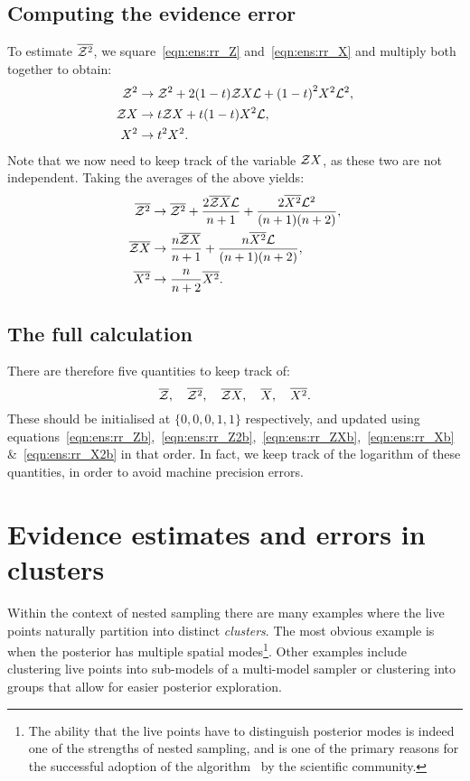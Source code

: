 \subsection{Computing the evidence error}
\label{sec:ens:basic_error}
To estimate \(\overline{\mathcal{Z}^2}\), we square~\eqref{eqn:ens:rr_Z} and~\eqref{eqn:ens:rr_X} and multiply both together to obtain:
%
\begin{align}
  \mathcal{Z}^2 &\to \mathcal{Z}^2 + 2(1-t)\mathcal{Z} X\mathcal{L} +  {(1-t)}^2X^2\mathcal{L} ^2,
  \label{eqn:ens:rr_Z2b}
  \\
  \mathcal{Z} X &\to t\mathcal{Z} X + t(1-t)X^2\mathcal{L},
  \label{eqn:ens:rr_ZXb}
  \\
  X^2 &\to t^2X^2.
  \label{eqn:ens:rr_X2b}
\end{align}
%
Note that we now need to keep track of the variable \(\mathcal{Z} X\), as these two are not independent.
Taking the averages of the above yields:
\begin{align}
  \overline{\mathcal{Z}^2} &\to \overline{\mathcal{Z}^2} + \frac{2\overline{\mathcal{Z} X}\mathcal{L}}{n+1} +  \frac{2\overline{X^2}\mathcal{L}^2}{(n+1)(n+2)},
  \\
  \overline{\mathcal{Z} X} &\to \frac{n\overline{\mathcal{Z} X}}{n+1} + \frac{n\overline{X^2}\mathcal{L}}{(n+1)(n+2)},
  \\
  \overline{X^2} &\to \frac{n}{n+2}\overline{X^2}.
\end{align}

\subsection{The full calculation}
\label{sec:ens:basic_full}

There are therefore five quantities to keep track of: 
\[ \overline{\mathcal{Z}},\quad\overline{\mathcal{Z}^2},\quad\overline{\mathcal{Z} X},\quad \overline{X},\quad\overline{X^2}.\]
These should be initialised at \(\{0,0,0,1,1\}\) respectively, and updated using equations~\eqref{eqn:ens:rr_Zb},~\eqref{eqn:ens:rr_Z2b},~\eqref{eqn:ens:rr_ZXb},~\eqref{eqn:ens:rr_Xb} \&~\eqref{eqn:ens:rr_X2b} in that order. In fact, we keep track of the logarithm of these quantities, in order to avoid machine precision errors.





\section{Evidence estimates and errors in clusters}
\label{sec:ens:evidences_clusters}
Within the context of nested sampling there are many examples where the live points naturally partition into distinct {\em clusters}. The most obvious example is when the posterior has multiple spatial modes\footnote{The ability that the live points have to distinguish posterior modes is indeed one of the strengths of nested sampling, and is one of the primary reasons for the successful adoption of the \MultiNest{} algorithm~\protect\citep{MultiNest1,MultiNest2,MultiNest3} by the scientific community.}. Other examples include clustering live points into sub-models of a multi-model sampler or clustering into groups that allow for easier posterior exploration.

